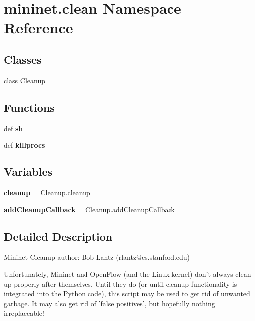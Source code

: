 \hypertarget{namespacemininet_1_1clean}{\section{mininet.\-clean Namespace Reference}
\label{namespacemininet_1_1clean}
}
\subsection*{Classes}
\begin{DoxyCompactItemize}
\item 
class \hyperlink{classmininet_1_1clean_1_1Cleanup}{Cleanup}
\end{DoxyCompactItemize}
\subsection*{Functions}
\begin{DoxyCompactItemize}
\item 
\hypertarget{namespacemininet_1_1clean_a26705ddf669c286c2f0f719ba9982665}{def {\bfseries sh}}\label{namespacemininet_1_1clean_a26705ddf669c286c2f0f719ba9982665}

\item 
\hypertarget{namespacemininet_1_1clean_a6b95b8510d3cb458bebe8b67ebebe321}{def {\bfseries killprocs}}\label{namespacemininet_1_1clean_a6b95b8510d3cb458bebe8b67ebebe321}

\end{DoxyCompactItemize}
\subsection*{Variables}
\begin{DoxyCompactItemize}
\item 
\hypertarget{namespacemininet_1_1clean_a7fd5ac864ed4904f3f4bfa12b09c9b6b}{{\bfseries cleanup} = Cleanup.\-cleanup}\label{namespacemininet_1_1clean_a7fd5ac864ed4904f3f4bfa12b09c9b6b}

\item 
\hypertarget{namespacemininet_1_1clean_ad8beee6808121d8662515ca0e99f005f}{{\bfseries add\-Cleanup\-Callback} = Cleanup.\-add\-Cleanup\-Callback}\label{namespacemininet_1_1clean_ad8beee6808121d8662515ca0e99f005f}

\end{DoxyCompactItemize}


\subsection{Detailed Description}
\begin{DoxyVerb}Mininet Cleanup
author: Bob Lantz (rlantz@cs.stanford.edu)

Unfortunately, Mininet and OpenFlow (and the Linux kernel)
don't always clean up properly after themselves. Until they do
(or until cleanup functionality is integrated into the Python
code), this script may be used to get rid of unwanted garbage.
It may also get rid of 'false positives', but hopefully
nothing irreplaceable!
\end{DoxyVerb}
 